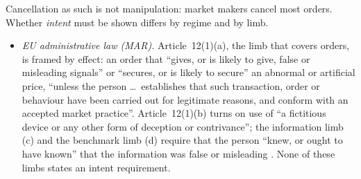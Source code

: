 \begin{qfrule}
 Cancellation as such is not manipulation: market makers cancel most orders. Whether \emph{intent} must be shown differs by regime and by limb.
\begin{itemize}
\item \emph{EU administrative law (MAR).} Article~12(1)(a), the limb that covers orders, is framed by effect: an order that ``gives, or is likely to give, false or misleading signals'' or ``secures, or is likely to secure'' an abnormal or artificial price, ``unless the person \dots\ establishes that such transaction, order or behaviour have been carried out for legitimate reasons, and conform with an accepted market practice''. Article~12(1)(b) turns on use of ``a fictitious device or any other form of deception or contrivance''; the information limb (c) and the benchmark limb (d) require that the person ``knew, or ought to have known'' that the information was false or misleading \citep[Art.~12(1)]{eu-mar-596-2014}. None of these limbs states an intent requirement.


\end{itemize}
\end{qfrule}
